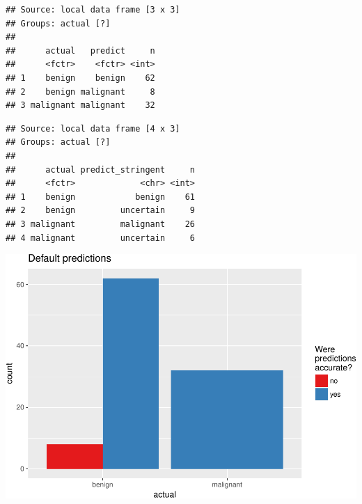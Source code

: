 \documentclass[]{article}
\newenvironment{Shaded}{\begin{snugshade}}{\end{snugshade}}
\newcommand{\KeywordTok}[1]{\textcolor[rgb]{0.13,0.29,0.53}{\textbf{{#1}}}}
\newcommand{\DataTypeTok}[1]{\textcolor[rgb]{0.13,0.29,0.53}{{#1}}}
\newcommand{\CharTok}[1]{\textcolor[rgb]{0.31,0.60,0.02}{{#1}}}
\newcommand{\StringTok}[1]{\textcolor[rgb]{0.31,0.60,0.02}{{#1}}}
\newcommand{\NormalTok}[1]{{#1}}
\begin{document}
\begin{verbatim}
## Source: local data frame [3 x 3]
## Groups: actual [?]
## 
##      actual   predict     n
##      <fctr>    <fctr> <int>
## 1    benign    benign    62
## 2    benign malignant     8
## 3 malignant malignant    32
\end{verbatim}

\begin{Shaded}
\end{Shaded}

\begin{verbatim}
## Source: local data frame [4 x 3]
## Groups: actual [?]
## 
##      actual predict_stringent     n
##      <fctr>             <chr> <int>
## 1    benign            benign    61
## 2    benign         uncertain     9
## 3 malignant         malignant    26
## 4 malignant         uncertain     6
\end{verbatim}

\begin{Shaded}
\end{Shaded}

\includegraphics{webinar_code_files/figure-latex/unnamed-chunk-52-1.pdf}
\end{document}
